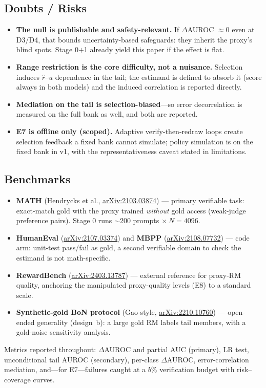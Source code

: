\documentclass[11pt]{article}
\newcommand{\rhat}{\hat r}
\newcommand{\arxiv}[1]{\href{https://arxiv.org/abs/#1}{arXiv:#1}}
\begin{document}
\subsection{Doubts / Risks}
\begin{itemize}[leftmargin=1.2em,itemsep=2pt]
  \item \textbf{The null is publishable and safety-relevant.} If $\Delta$AUROC
    $\approx 0$ even at D3/D4, that bounds uncertainty-based safeguards: they inherit
    the proxy's blind spots. Stage 0$+$1 already yield this paper if the effect is flat.
  \item \textbf{Range restriction is the core difficulty, not a nuisance.} Selection
    induces $\rhat$--$u$ dependence in the tail; the estimand is defined to absorb it
    (score always in both models) and the induced correlation is reported directly.
  \item \textbf{Mediation on the tail is selection-biased}---so error decorrelation is
    measured on the full bank as well, and both are reported.
  \item \textbf{E7 is offline only (scoped).} Adaptive verify-then-redraw loops create
    selection feedback a fixed bank cannot simulate; policy simulation is on the fixed
    bank in v1, with the representativeness caveat stated in limitations.
\end{itemize}

\subsection{Benchmarks}
\begin{itemize}[leftmargin=1.2em,itemsep=3pt]
  \item \textbf{MATH} (Hendrycks et al., \arxiv{2103.03874}) --- primary verifiable
    task: exact-match gold with the proxy trained \emph{without} gold access
    (weak-judge preference pairs). Stage 0 runs $\sim$200 prompts $\times\ N{=}4096$.
  \item \textbf{HumanEval} (\arxiv{2107.03374}) and \textbf{MBPP}
    (\arxiv{2108.07732}) --- code arm: unit-test pass/fail as gold, a second
    verifiable domain to check the estimand is not math-specific.
  \item \textbf{RewardBench} (\arxiv{2403.13787}) --- external reference for proxy-RM
    quality, anchoring the manipulated proxy-quality levels (E8) to a standard scale.
  \item \textbf{Synthetic-gold BoN protocol} (Gao-style, \arxiv{2210.10760}) ---
    open-ended generality (design~b): a large gold RM labels tail members, with a
    gold-noise sensitivity analysis.
\end{itemize}
Metrics reported throughout: $\Delta$AUROC and partial AUC (primary), LR test,
unconditional tail AUROC (secondary), per-class $\Delta$AUROC, error-correlation
mediation, and---for E7---failures caught at a $b\%$ verification budget with
risk--coverage curves.
\end{document}
